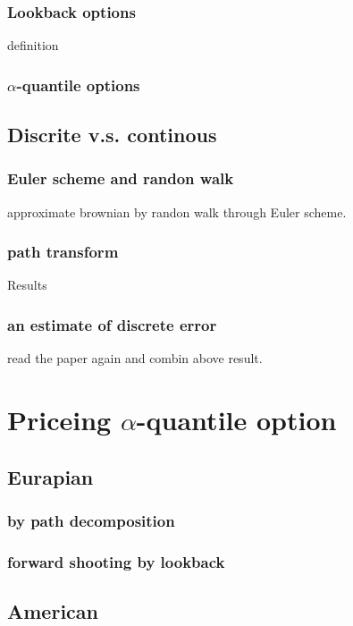\documentclass[11pt]{book}
\begin{document}
\subsection{Lookback options}
definition

\subsection{$\alpha$-quantile options}

\section{Discrite v.s. continous}
\subsection{Euler scheme and randon walk}
approximate brownian by randon walk through Euler scheme.

\subsection{path transform}
Results\cite{Chaumont1999}

\subsection{an estimate of discrete error}
read the paper again and combin above result. 

\chapter{Priceing $\alpha$-quantile option}
\section{Eurapian}
\subsection{by path decomposition}

\subsection{forward shooting by lookback}


\section{American}

{}

\end{document}
